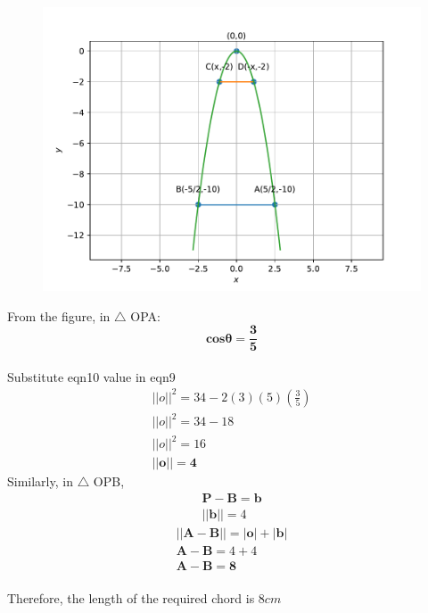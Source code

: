 \documentclass[journal,10pt,twocolumn]{article}
\begin{document}
\begin{figure}[h]
\includegraphics[width=1\columnwidth]{fig.pdf}
\end{figure}
 From the figure, in $\triangle$ OPA:
\begin{equation}
\boldsymbol{cos\theta} = \boldsymbol{\frac{3}{5}}
\end{equation}
\\ Substitute eqn10 value in eqn9
\begin{eqnarray}
||o||^2 = 34 - 2(3)(5)(\frac{3}{5})
\\ ||o||^2 = 34-18
\\ ||o||^2 = 16
\\ \boldsymbol{||o||} =\boldsymbol{4}
\end{eqnarray}
Similarly, in $\triangle$ OPB,
\begin{eqnarray}
	\boldsymbol{P}-\boldsymbol{B} = \boldsymbol{b}
\\	||\boldsymbol{b}|| = 4
\end{eqnarray}
\begin{eqnarray}
	||\boldsymbol{A-B}|| =|\boldsymbol{o}|+|\boldsymbol{b}|
	\\ \boldsymbol{A-B} = 4+4
	\\ \boldsymbol{A-B} = \boldsymbol{8}
\end{eqnarray}
\\ Therefore, the length of the required chord is $8cm$
\end{document}
